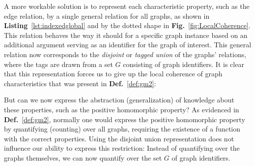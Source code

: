 A more workable solution is to represent each characteristic property, such as the edge relation, by a single general relation for all graphs, as shown in \textbf{Listing}~\ref{lst:indexedglobal} and by the dotted shape in \textbf{Fig.}~\ref{fig:LocalCoherence}.
This relation behaves the way it should for a specific graph instance based on an additional argument serving as an identifier for the graph of interest.
This general relation now corresponds to the \emph{disjoint} or \emph{tagged union} of the graphs' relations, where the tags are drawn from a set $G$ consisting of graph identifiers.
It is clear that this representation forces us to give up the local coherence of graph characteristics that was present in \textbf{Def.}~\ref{def:gm2}: 


But can we now express the abstraction (generalization) of knowledge about these properties, such as the positive homomorphic property?
As evidenced in \textbf{Def.}~\ref{def:gm2}, normally one would express the positive homomorphic property by quantifying (counting) over all graphs, requiring the existence of a function with the correct properties.
Using the disjoint union representation does not influence our ability to express this restriction: Instead of quantifying over the graphs themselves, we can now quantify over the set $G$ of graph identifiers.

